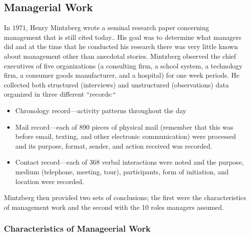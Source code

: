 \subsection{Managerial Work}

In $ 1971 $, Henry Mintzberg wrote a seminal research paper concerning management that is still cited today.\cite{mintzberg1971managerial}. His goal was to determine what managers did and at the time that he conducted his research there was very little known about management other than anecdotal stories. Mintzberg observed the chief executives of five organizations (a consulting firm, a school system, a technology firm, a consumer goods manufacturer, and a hospital) for one week periods. He collected both structured (interviews) and unstructured (observations) data organized in three different ``records:``

\begin{itemize}
	\item Chronology record---activity patterns throughout the day
	\item Mail record---each of $ 890 $ pieces of physical mail (remember that this was before email, texting, and other electronic communication) were processed and its purpose, format, sender, and action received was recorded.
	\item Contact record---each of $ 368 $ verbal interactions were noted and the purpose, medium (telephone, meeting, tour), participants, form of initiation, and location were recorded.
\end{itemize}

Mintzberg then provided two sets of conclusions; the first were the characteristics of management work and the second with the 10 roles managers assumed.

\subsubsection{Characteristics of Manageerial Work}

